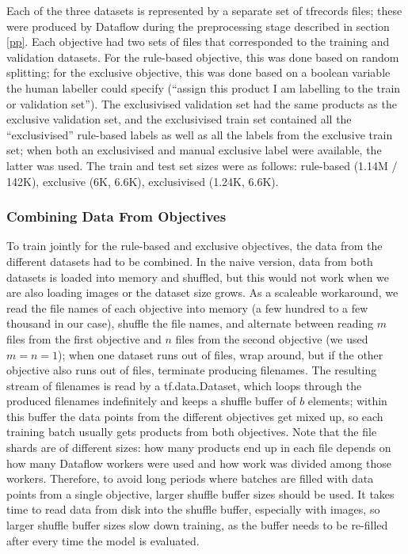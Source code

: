 Each of the three datasets is represented by a separate set of tfrecords files; these were produced by Dataflow during the preprocessing stage described in section \ref{pp}.
Each objective had two sets of files that corresponded to the training and validation datasets.
For the rule-based objective, this was done based on random splitting; for the exclusive objective, this was done based on a boolean variable the human labeller could specify (``assign this product I am labelling to the train or validation set'').
The exclusivised validation set had the same products as the exclusive validation set, and the exclusivised train set contained all the ``exclusivised'' rule-based labels as well as all the labels from the exclusive train set; when both an exclusivised and manual exclusive label were available, the latter was used.
The train and test set sizes were as follows: rule-based (1.14M / 142K), exclusive (6K, 6.6K), exclusivised (1.24K, 6.6K).

\subsubsection{Combining Data From Objectives}

To train jointly for the rule-based and exclusive objectives, the data from the different datasets had to be combined.
In the naive version, data from both datasets is loaded into memory and shuffled, but this would not work when we are also loading images or the dataset size grows.
As a scaleable workaround, we read the file names of each objective into memory (a few hundred to a few thousand in our case), shuffle the file names, and alternate between reading $m$ files from the first objective and $n$ files from the second objective (we used $m = n = 1$); when one dataset runs out of files, wrap around, but if the other objective also runs out of files, terminate producing filenames.
The resulting stream of filenames is read by a tf.data.Dataset, which loops through the produced filenames indefinitely and keeps a shuffle buffer of $b$ elements; within this buffer the data points from the different objectives get mixed up, so each training batch usually gets products from both objectives.
Note that the file shards are of different sizes: how many products end up in each file depends on how many Dataflow workers were used and how work was divided among those workers.
Therefore, to avoid long periods where batches are filled with data points from a single objective, larger shuffle buffer sizes should be used.
It takes time to read data from disk into the shuffle buffer, especially with images, so larger shuffle buffer sizes slow down training, as the buffer needs to be re-filled after every time the model is evaluated.

